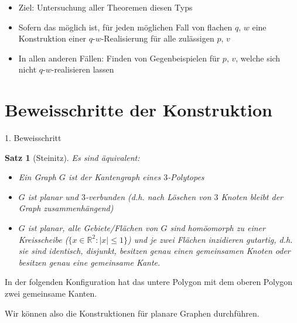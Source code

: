\documentclass[10pt, notheorems]{beamer}
\newtheorem{theorem}{Satz}[section]
\newcommand{\set}[1]{\{ #1 \}}
\newcommand{\reals}{\mathbb{R}}
\newcommand{\hdef}[1]{\textcolor{darkred2}{#1}}
\begin{document}
\begin{frame}
  \begin{itemize}
  \item Ziel: Untersuchung aller Theoremen diesen Typs
    \pause
  \item Sofern das möglich ist, für jeden möglichen Fall von flachen $q$, $w$ eine Konstruktion einer $q$-$w$-Realisierung für alle zulässigen $p$, $v$
    \pause
  \item In allen anderen Fällen: Finden von Gegenbeispielen für $p$, $v$, welche sich nicht $q$-$w$-realisieren lassen
  \end{itemize}
\end{frame}

\section{Beweisschritte der Konstruktion}

\begin{frame}{1. Beweisschritt}
  \begin{theorem}[{\sc Steinitz}]
    Es sind äquivalent:
    \begin{itemize}
    \item Ein Graph $G$ ist der Kantengraph eines $3$-Polytopes
    \item $G$ ist planar und $3$-verbunden (d.h. nach Löschen von $3$ Knoten bleibt der Graph zusammenhängend)
    \item $G$ ist planar, alle Gebiete/Flächen von $G$ sind homöomorph zu einer Kreisscheibe ($\set{x \in \reals^2 : |x| \leq 1}$) und je zwei Flächen \hdef{inzidieren gutartig}, d.h. sie sind identisch, disjunkt, besitzen genau einen gemeinsamen Knoten oder besitzen genau eine gemeinsame Kante.
    \end{itemize}
  \end{theorem}
  \pause
  \begin{example}
    In der folgenden Konfiguration hat das untere Polygon mit dem oberen Polygon zwei gemeinsame Kanten.
    
    { \centering
      \par
    }
  \end{example}
  \pause

  Wir können also die Konstruktionen für planare Graphen durchführen.

\end{frame}
\end{document}
